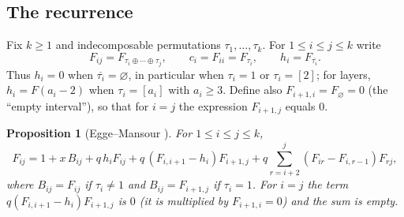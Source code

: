 \documentclass[11pt]{amsart}
\newtheorem{proposition}[theorem]{Proposition}
\theoremstyle{definition}
\newcommand{\ds}{\oplus}
\newcommand{\red}[1]{\overline{#1}}
\begin{document}
\subsection{The recurrence}
Fix $k\ge1$ and indecomposable permutations $\tau_1,\dots,\tau_k$. For $1\le i\le j\le k$ write
\[
F_{ij}=F_{\tau_i\ds\cdots\ds\tau_j},\qquad c_i=F_{ii}=F_{\tau_i},\qquad h_i=F_{\red{\tau_i}}.
\]
Thus $h_i=0$ when $\red{\tau_i}=\varnothing$, in particular when $\tau_i=1$ or $\tau_i=[2]$; for layers, $h_i=F(a_i-2)$ when $\tau_i=[a_i]$ with $a_i\ge3$. Define also $F_{i+1,i}=F_\varnothing=0$ (the ``empty interval''), so that for $i=j$ the expression $F_{i+1,j}$ equals $0$.

\begin{proposition}[Egge--Mansour {\cite[Theorem 3.3]{EggeMansour2006}}]\label{prop:rec}
For $1\le i\le j\le k$,
\begin{equation}\label{eq:rec}
F_{ij}=1+x\,B_{ij}+q\,h_iF_{ij}+q\,(F_{i,i+1}-h_i)F_{i+1,j}+q\sum_{r=i+2}^{j}(F_{ir}-F_{i,r-1})F_{rj},
\end{equation}
where $B_{ij}=F_{ij}$ if $\tau_i\ne1$ and $B_{ij}=F_{i+1,j}$ if $\tau_i=1$. For $i=j$ the term $q(F_{i,i+1}-h_i)F_{i+1,j}$ is $0$ (it is multiplied by $F_{i+1,i}=0$) and the sum is empty.
\end{proposition}
\end{document}
